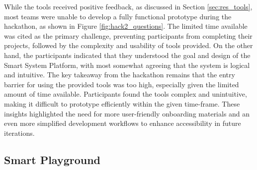 While the tools received positive feedback, as discussed in Section \ref{sec:res_tools}, most teams were unable to develop a fully functional prototype during the hackathon, as shown in Figure \ref{fig:hack2_questions}. The limited time available was cited as the primary challenge, preventing participants from completing their projects, followed by the complexity and usability of tools provided. On the other hand, the participants indicated that they understood the goal and design of the Smart System Platform, with most somewhat agreeing that the system is logical and intuitive. The key takeaway from the hackathon remains that the entry barrier for using the provided tools was too high, especially given the limited amount of time available. Participants found the tools complex and unintuitive, making it difficult to prototype efficiently within the given time-frame. These insights highlighted the need for more user-friendly onboarding materials and an even more simplified development workflows to enhance accessibility in future iterations.

\subsection{\label{sec:res_smartplayground}\label{sec:res_honourablementions}Smart Playground}


